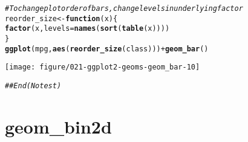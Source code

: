 \documentclass[a4paper,titlepage]{tufte-handout}\usepackage[]{graphicx}\usepackage[]{color}
\makeatletter
\def\maxwidth{ %
  \ifdim\Gin@nat@width>\linewidth
    \linewidth
  \else
    \Gin@nat@width
  \fi
}
\newcommand{\hlcom}[1]{\textcolor[rgb]{0.678,0.584,0.686}{\textit{#1}}}%
\newcommand{\hlopt}[1]{\textcolor[rgb]{0,0,0}{#1}}%
\newcommand{\hlstd}[1]{\textcolor[rgb]{0.345,0.345,0.345}{#1}}%
\newcommand{\hlkwa}[1]{\textcolor[rgb]{0.161,0.373,0.58}{\textbf{#1}}}%
\newcommand{\hlkwb}[1]{\textcolor[rgb]{0.69,0.353,0.396}{#1}}%
\newcommand{\hlkwc}[1]{\textcolor[rgb]{0.333,0.667,0.333}{#1}}%
\newcommand{\hlkwd}[1]{\textcolor[rgb]{0.737,0.353,0.396}{\textbf{#1}}}%
\newenvironment{kframe}{%
 \def\at@end@of@kframe{}%
 \ifinner\ifhmode%
  \def\at@end@of@kframe{\end{minipage}}%
  \begin{minipage}{\columnwidth}%
 \fi\fi%
 \def\FrameCommand##1{\hskip\@totalleftmargin \hskip-\fboxsep
 \colorbox{shadecolor}{##1}\hskip-\fboxsep
     \hskip-\linewidth \hskip-\@totalleftmargin \hskip\columnwidth}%
 \MakeFramed {\advance\hsize-\width
   \@totalleftmargin\z@ \linewidth\hsize
   \@setminipage}}%
 {\par\unskip\endMakeFramed%
 \at@end@of@kframe}
\newenvironment{knitrout}{}{} %
\makeatother
\begin{document}
\begin{knitrout}
\begin{kframe}\begin{alltt}
\hlcom{# To change plot order of bars, change levels in underlying factor}
\hlstd{reorder_size} \hlkwb{<-} \hlkwa{function}\hlstd{(}\hlkwc{x}\hlstd{) \{}
  \hlkwd{factor}\hlstd{(x,} \hlkwc{levels} \hlstd{=} \hlkwd{names}\hlstd{(}\hlkwd{sort}\hlstd{(}\hlkwd{table}\hlstd{(x))))}
\hlstd{\}}
\hlkwd{ggplot}\hlstd{(mpg,} \hlkwd{aes}\hlstd{(}\hlkwd{reorder_size}\hlstd{(class)))} \hlopt{+} \hlkwd{geom_bar}\hlstd{()}
\end{alltt}
\end{kframe}
\texttt{[image: figure/021-ggplot2-geoms-geom\_bar-10]} 
\begin{kframe}\begin{alltt}
\hlcom{## End(No test)}
\end{alltt}
\end{kframe}
\end{knitrout}


\section{geom\_bin2d}
\end{document}
